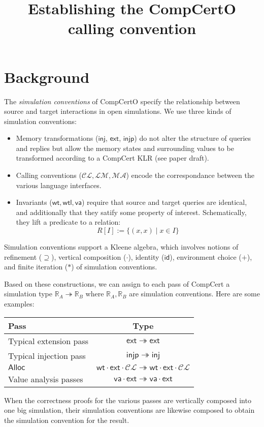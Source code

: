 \documentclass[11pt]{article}
\title{Establishing the CompCertO calling convention}
\begin{document}
\maketitle

\section{Background}

The \emph{simulation conventions} of CompCertO
specify the relationship between
source and target interactions
in open simulations.
We use three kinds of simulation conventions:
\begin{itemize}
  \item Memory transformations ($\mathsf{inj}$, $\mathsf{ext}$, $\mathsf{injp}$)
    do not alter the structure of queries and replies but
    allow the memory states and surrounding values
    to be transformed according to a CompCert KLR
    (see paper draft).
  \item Calling conventions ($\mathcal{C\!L}, \mathcal{L\!M}, \mathcal{M\!A}$)
    encode the correspondance between the various language interfaces.
  \item Invariants ($\mathsf{wt}, \mathsf{wtl}, \mathsf{va}$)
    require that source and target queries are identical,
    and additionally that they satify some property of interest.
    Schematically, they lift a predicate to a relation:
    \[
      R[I] := \{ (x, x) \mid x \in I \}
    \]
\end{itemize}
Simulation conventions support a Kleene algebra,
which involves notions of refinement ($\supseteq$),
vertical composition ($\cdot$),
identity ($\mathsf{id}$),
environment choice ($+$),
and finite iteration ($*$) of simulation conventions.

Based on these constructions,
we can assign to each pass of CompCert
a simulation type $\mathbb{R}_A \twoheadrightarrow \mathbb{R}_B$
where $\mathbb{R}_A, \mathbb{R}_B$ are simulation conventions.
Here are some examples:
\begin{center}
  \begin{tabular}{lc}
    \hline
    Pass & Type \\
    \hline
    Typical extension pass &
      $\mathsf{ext} \twoheadrightarrow \mathsf{ext}$ \\
    Typical injection pass &
      $\mathsf{injp} \twoheadrightarrow \mathsf{inj}$ \\
    $\mathsf{Alloc}$ &
      $\mathsf{wt} \cdot \mathsf{ext} \cdot \mathcal{C\!L}
       \twoheadrightarrow
       \mathsf{wt} \cdot \mathsf{ext} \cdot \mathcal{C\!L}$ \\
    Value analysis passes &
      $\mathsf{va} \cdot \mathsf{ext} \twoheadrightarrow
       \mathsf{va} \cdot \mathsf{ext}$ \\
    \hline
  \end{tabular}
\end{center}
When the correctness proofs for the various passes
are vertically composed into one big simulation,
their simulation conventions are likewise composed
to obtain the simulation convention for the result.
\end{document}
